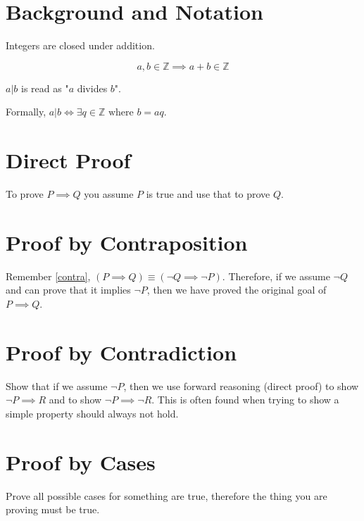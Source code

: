 
\section{Background and Notation}
\begin{definition}[Integers]
  Integers are closed under addition.

  \[
    a,b \in \mathbb{Z} \implies a + b \in \mathbb{Z}
  \]
\end{definition}
\begin{definition}[Divisable]
  $a|b$ is read as "$a$ divides $b$".

  Formally, $a|b \iff \exists q\in\mathbb{Z} \text{ where } b=aq$.
\end{definition}
\section{Direct Proof}
To prove $P \implies Q$ you assume $P$ is true and use that to prove $Q$.
\section{Proof by Contraposition}
Remember \ref{contra}, $(P \implies Q) \equiv (\lnot Q \implies \lnot P)$.
Therefore, if we assume $\lnot Q$ and can prove that it implies $\lnot P$, then
we have proved the original goal of $P \implies Q$.
\section{Proof by Contradiction}
Show that if we assume $\lnot P$, then we use forward reasoning (direct proof)
to show $\lnot P \implies R$ and to show $\lnot P \implies \lnot R$. This is
often found when trying to show a simple property should always not hold.
\section{Proof by Cases}
Prove all possible cases for something are true, therefore the thing you are
proving must be true.

